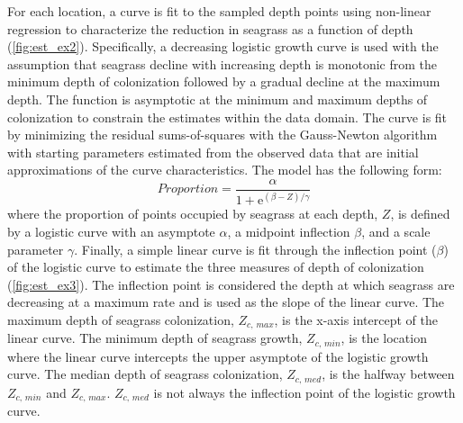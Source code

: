 \documentclass[letterpaper,12pt,oneside]{article}\usepackage[]{graphicx}\usepackage[]{color}
\begin{document}
For each location, a curve is fit to the sampled depth points using non-linear regression to characterize the reduction in seagrass as a function of depth (\cref{fig:est_ex2}).  Specifically, a decreasing logistic growth curve is used with the assumption that seagrass decline with increasing depth is monotonic from the minimum depth of colonization followed by a gradual decline at the maximum depth.  The function is asymptotic at the minimum and maximum depths of colonization to constrain the estimates within the data domain. The curve is fit by minimizing the residual sums-of-squares with the Gauss-Newton algorithm \citep{Bates92} with starting parameters estimated from the observed data that are initial approximations of the curve characteristics.  The model has the following form:
\begin{equation} \label{eqn:prop}
 Proportion = \frac{\alpha}{1 + \mathrm{e}^{{\left(\beta - Z\right)/\gamma}}}
\end{equation}
where the proportion of points occupied by seagrass at each depth, $Z$, is defined by a logistic curve with an asymptote $\alpha$, a midpoint inflection $\beta$, and a scale parameter $\gamma$.  Finally, a simple linear curve is fit through the inflection point ($\beta$) of the logistic curve to estimate the three measures of depth of colonization (\cref{fig:est_ex3}).  The inflection point is considered the depth at which seagrass are decreasing at a maximum rate and is used as the slope of the linear curve.  The maximum depth of seagrass colonization, $Z_{c,\,max}$, is the x-axis intercept of the linear curve.  The minimum depth of seagrass growth, $Z_{c,\,min}$, is the location where the linear curve intercepts the upper asymptote of the logistic growth curve.  The median depth of seagrass colonization, $Z_{c,\,med}$, is the halfway between $Z_{c,\,min}$ and $Z_{c,\,max}$.  $Z_{c,\,med}$ is not always the inflection point of the logistic growth curve.
\end{document}
